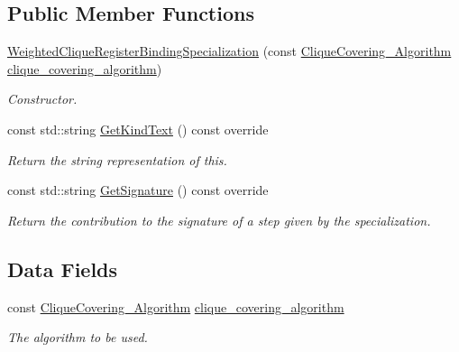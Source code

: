 \subsection*{Public Member Functions}
\begin{DoxyCompactItemize}
\item 
\hyperlink{classWeightedCliqueRegisterBindingSpecialization_a39e0eaf83a216a452529a318e6ddba90}{Weighted\+Clique\+Register\+Binding\+Specialization} (const \hyperlink{clique__covering_8hpp_acc23ade19dac4d6935b7792353e207d9}{Clique\+Covering\+\_\+\+Algorithm} \hyperlink{classWeightedCliqueRegisterBindingSpecialization_a77001a728b4e35958d4e92925ab2fe01}{clique\+\_\+covering\+\_\+algorithm})
\begin{DoxyCompactList}\small\item\em Constructor. \end{DoxyCompactList}\item 
const std\+::string \hyperlink{classWeightedCliqueRegisterBindingSpecialization_a988d2215af6d7303378ed138b33d93f7}{Get\+Kind\+Text} () const override
\begin{DoxyCompactList}\small\item\em Return the string representation of this. \end{DoxyCompactList}\item 
const std\+::string \hyperlink{classWeightedCliqueRegisterBindingSpecialization_abced50010cc1e667c05ab536e61edebd}{Get\+Signature} () const override
\begin{DoxyCompactList}\small\item\em Return the contribution to the signature of a step given by the specialization. \end{DoxyCompactList}\end{DoxyCompactItemize}
\subsection*{Data Fields}
\begin{DoxyCompactItemize}
\item 
const \hyperlink{clique__covering_8hpp_acc23ade19dac4d6935b7792353e207d9}{Clique\+Covering\+\_\+\+Algorithm} \hyperlink{classWeightedCliqueRegisterBindingSpecialization_a77001a728b4e35958d4e92925ab2fe01}{clique\+\_\+covering\+\_\+algorithm}
\begin{DoxyCompactList}\small\item\em The algorithm to be used. \end{DoxyCompactList}\end{DoxyCompactItemize}


